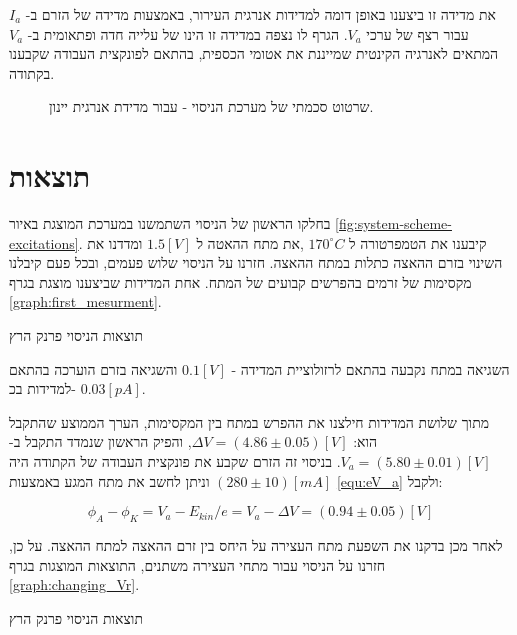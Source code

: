 \documentclass{article}
\begin{document}
את מדידה זו ביצענו באופן דומה למדידות אנרגית העירור, באמצעות מדידה של הזרם ב-
$I_a$
עבור רצף של ערכי
$V_a$.
הגרף לו נצפה במדידה זו הינו של עלייה חדה ופתאומית ב-
$V_a$
המתאים לאנרגיה הקינטית שמייננת את אטומי הכספית, בהתאם לפונקצית העבודה שקבענו בקתודה.

\begin{figure}
   \centering
   \caption{
   שרטוט סכמתי של מערכת הניסוי - עבור מדידת אנרגית יינון.
   }
   \label{fig:system-scheme-ionization}
\end{figure}

\clearpage

\section{תוצאות}
בחלקו הראשון של הניסוי השתמשנו במערכת המוצגת באיור
\ref{fig:system-scheme-excitations}.
קיבענו את הטמפרטורה ל
$170 ^{\circ} C$
,את מתח ההאטה ל
$1.5 [V]$
ומדדנו את השינוי בזרם ההאצה כתלות במתח ההאצה.
חזרנו על הניסוי שלוש פעמים, ובכל פעם קיבלנו מקסימות של זרמים בהפרשים קבועים של המתח.
אחת המדידות שביצענו מוצגת בגרף
\ref{graph:first_mesurment}.
 
\begin{graph}[H]
	\begin{center}
	\resizebox{\textwidth}{!}{}
	\end{center}
	\caption{תוצאות הניסוי פרנק הרץ}
\label{graph:first_mesurment}
\end{graph}

השגיאה במתח נקבעה בהתאם לרזולוציית המדידה - 
$0.1 [V]$
והשגיאה בזרם הוערכה בהתאם למדידות בכ- 
$0.03 [pA]$.

מתוך שלושת המדידות חילצנו את ההפרש במתח בין המקסימות, הערך הממוצע שהתקבל הוא:
$\Delta V = (4.86 \pm 0.05)[V]$,
והפיק הראשון שנמדד התקבל ב- 
$V_a = (5.80 \pm 0.01)[V]$.
בניסוי זה הזרם שקבע את פונקצית העבודה של הקתודה היה
$(280 \pm 10) [mA]$
וניתן לחשב את מתח המגע באמצעות
\ref{equ:eV_a}
ולקבל:

$$ \phi_A - \phi_K = V_a - E_{kin}/e = V_a - \Delta V = (0.94 \pm 0.05) [V]$$ 

לאחר מכן בדקנו את השפעת מתח העצירה על היחס בין זרם ההאצה למתח ההאצה.
על כן, חזרנו על הניסוי עבור מתחי העצירה משתנים, התוצאות המוצגות בגרף
\ref{graph:changing_Vr}.

\begin{graph}[H]
	\begin{center}
	\resizebox{\textwidth}{!}{}
	\end{center}
	\caption{תוצאות הניסוי פרנק הרץ}
	\label{graph:changing_Vr}
\end{graph}
\end{document}

